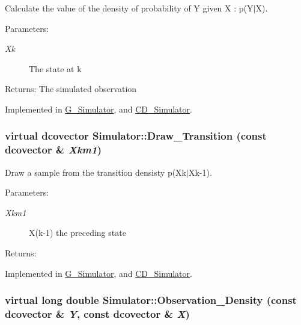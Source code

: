 Calculate the value of the density of probability of Y given X : p(Y$|$X). 

\begin{Desc}
\item[Parameters:]
\begin{description}
\item[{\em Xk}]The state at k\end{description}
\end{Desc}
\begin{Desc}
\item[Returns:]The simulated observation \end{Desc}


Implemented in \hyperlink{class_g___simulator_b53bc573683cef16a5117dcc71a1f0a7}{G\_\-Simulator}, and \hyperlink{class_c_d___simulator_3770eddf939898b6dccc39a556eaf8c9}{CD\_\-Simulator}.\hypertarget{class_simulator_45790421a1c2f597739d3e972ad28292}{
\subsubsection[{Draw\_\-Transition}]{\setlength{\rightskip}{0pt plus 5cm}virtual dcovector Simulator::Draw\_\-Transition (const dcovector \& {\em Xkm1})}}
\label{class_simulator_45790421a1c2f597739d3e972ad28292}


Draw a sample from the transition densisty p(Xk$|$Xk-1). 

\begin{Desc}
\item[Parameters:]
\begin{description}
\item[{\em Xkm1}]X(k-1) the preceding state\end{description}
\end{Desc}
\begin{Desc}
\item[Returns:]\end{Desc}


Implemented in \hyperlink{class_g___simulator_54563826e17b08d4cf66090731797888}{G\_\-Simulator}, and \hyperlink{class_c_d___simulator_58019a5001ec77da3233b072f6328b30}{CD\_\-Simulator}.\hypertarget{class_simulator_75b0dfb5b0b88346ecb9f7da4fbd91f1}{
\subsubsection[{Observation\_\-Density}]{\setlength{\rightskip}{0pt plus 5cm}virtual long double Simulator::Observation\_\-Density (const dcovector \& {\em Y}, \/  const dcovector \& {\em X})}}
\label{class_simulator_75b0dfb5b0b88346ecb9f7da4fbd91f1}


